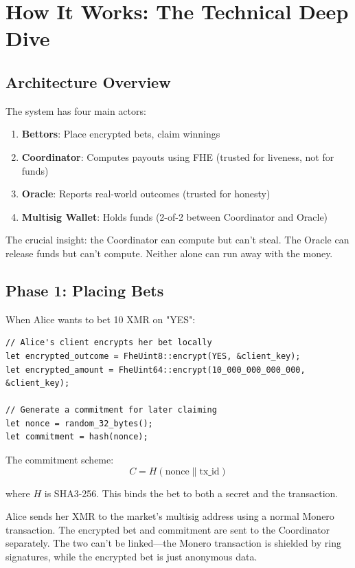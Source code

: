 \documentclass{article}
\begin{document}
\section{How It Works: The Technical Deep Dive}

\subsection{Architecture Overview}

The system has four main actors:

\begin{enumerate}
\item \textbf{Bettors}: Place encrypted bets, claim winnings

\item \textbf{Coordinator}: Computes payouts using FHE (trusted for liveness, not for funds)

\item \textbf{Oracle}: Reports real-world outcomes (trusted for honesty)

\item \textbf{Multisig Wallet}: Holds funds (2-of-2 between Coordinator and Oracle)

\end{enumerate}

The crucial insight: the Coordinator can compute but can't steal. The Oracle can release funds but can't compute. Neither alone can run away with the money.

\subsection{Phase 1: Placing Bets}

When Alice wants to bet 10 XMR on "YES":

\begin{verbatim}
// Alice's client encrypts her bet locally
let encrypted_outcome = FheUint8::encrypt(YES, &client_key);
let encrypted_amount = FheUint64::encrypt(10_000_000_000_000, &client_key);

// Generate a commitment for later claiming
let nonce = random_32_bytes();
let commitment = hash(nonce);
\end{verbatim}

The commitment scheme:
$$C = H(\text{nonce} \| \text{tx\_id})$$

where $H$ is SHA3-256. This binds the bet to both a secret and the transaction.

Alice sends her XMR to the market's multisig address using a normal Monero transaction. The encrypted bet and commitment are sent to the Coordinator separately. The two can't be linked---the Monero transaction is shielded by ring signatures, while the encrypted bet is just anonymous data.
\end{document}
